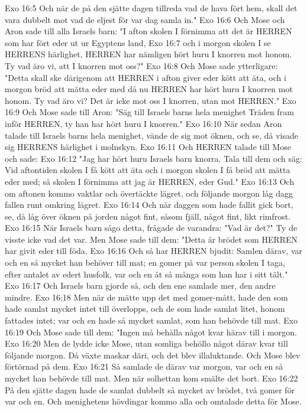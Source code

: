 Exo 16:5  Och när de på den sjätte dagen tillreda vad de hava fört hem, skall det vara dubbelt mot vad de eljest för var dag samla in."
Exo 16:6  Och Mose och Aron sade till alla Israels barn: "I afton skolen I förnimma att det är HERREN som har fört eder ut ur Egyptens land,
Exo 16:7  och i morgon skolen I se HERRENS härlighet, HERREN har nämligen hört huru I knorren mot honom. Ty vad äro vi, att I knorren mot oss?"
Exo 16:8  Och Mose sade ytterligare: "Detta skall ske därigenom att HERREN i afton giver eder kött att äta, och i morgon bröd att mätta eder med då nu HERREN har hört huru I knorren mot honom. Ty vad äro vi? Det är icke mot oss I knorren, utan mot HERREN."
Exo 16:9  Och Mose sade till Aron: "Säg till Israels barns hela menighet Träden fram inför HERREN, ty han har hört huru I knorren."
Exo 16:10  När sedan Aron talade till Israels barns hela menighet, vände de sig mot öknen, och se, då visade sig HERRENS härlighet i molnskyn.
Exo 16:11  Och HERREN talade till Mose och sade:
Exo 16:12  "Jag har hört huru Israels barn knorra. Tala till dem och säg: Vid aftontiden skolen I få kött att äta och i morgon skolen I få bröd att mätta eder med; så skolen I förnimma att jag är HERREN, eder Gud."
Exo 16:13  Och om aftonen kommo vaktlar och övertäckte lägret, och följande morgon låg dagg fallen runt omkring lägret.
Exo 16:14  Och när daggen som hade fallit gick bort, se, då låg över öknen på jorden något fint, såsom fjäll, något fint, likt rimfrost.
Exo 16:15  När Israels barn sågo detta, frågade de varandra: "Vad är det?" Ty de visste icke vad det var. Men Mose sade till dem: "Detta är brödet som HERREN har givit eder till föda.
Exo 16:16  Och så har HERREN bjudit: Samlen därav, var och en så mycket han behöver till mat; en gomer på var person skolen I taga, efter antalet av edert husfolk, var och en åt så många som han har i sitt tält."
Exo 16:17  Och Israels barn gjorde så, och den ene samlade mer, den andre mindre.
Exo 16:18  Men när de mätte upp det med gomer-mått, hade den som hade samlat mycket intet till överlopps, och de som hade samlat litet, honom fattades intet; var och en hade så mycket samlat, som han behövde till mat.
Exo 16:19  Och Mose sade till dem: "Ingen må behålla något kvar härav till i morgon.
Exo 16:20  Men de lydde icke Mose, utan somliga behöllo något därav kvar till följande morgon. Då växte maskar däri, och det blev illaluktande. Och Mose blev förtörnad på dem.
Exo 16:21  Så samlade de därav var morgon, var och en så mycket han behövde till mat. Men när solhettan kom smälte det bort.
Exo 16:22  På den sjätte dagen hade de samlat dubbelt så mycket av brödet, två gomer för var och en. Och menighetens hövdingar kommo alla och omtalade detta för Mose.

